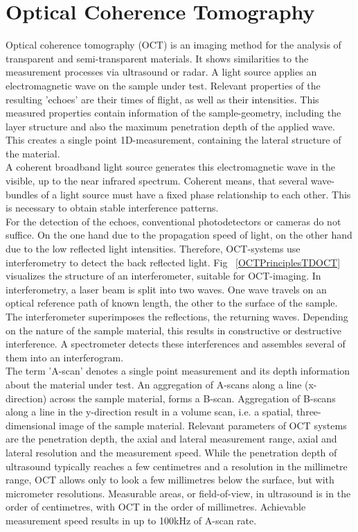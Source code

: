 \section{Optical Coherence Tomography}
Optical coherence tomography (OCT) is an imaging method for the analysis of transparent and semi-transparent materials. It shows similarities to the measurement processes via ultrasound or radar. A light source applies an electromagnetic wave on the sample under test. Relevant properties of the resulting 'echoes' are their times of flight, as well as their intensities. This measured properties contain information of the sample-geometry, including the layer structure and also the maximum penetration depth of the applied wave. This creates a single point 1D-measurement, containing the lateral structure of the material. \\ 
A coherent broadband light source generates this electromagnetic wave in the visible, up to the near infrared spectrum. Coherent means, that several wave-bundles of a light source must have a fixed phase relationship to each other. This is necessary to obtain stable interference patterns. \\ 
For the detection of the echoes, conventional photodetectors or cameras do not suffice. On the one hand due to the propagation speed of light, on the other hand due to the low reflected light intensities. Therefore, OCT-systems use interferometry to detect the back reflected light. Fig ~\ref{OCTPrinciplesTDOCT} visualizes the structure of an interferometer, suitable for OCT-imaging. In interferometry, a laser beam is split into two waves. One wave travels on an optical reference path of known length, the other to the surface of the sample. The interferometer superimposes the reflections, the returning waves. Depending on the nature of the sample material, this results in constructive or destructive interference. A spectrometer detects these interferences and assembles several of them into an interferogram.  \\ 
The term 'A-scan' denotes a single point measurement and its depth information about the material under test. An aggregation of A-scans along a line (x-direction) across the sample material, forms a B-scan. Aggregation of B-scans along a line in the y-direction result in a volume scan, i.e. a spatial, three-dimensional image of the sample material. Relevant parameters of OCT systems are the penetration depth, the axial and lateral measurement range, axial and lateral resolution and the measurement speed. While the penetration depth of ultrasound typically reaches a few centimetres and a resolution in the millimetre range, OCT allows only to look a few millimetres below the surface, but with micrometer resolutions. Measurable areas, or field-of-view, in ultrasound is in the order of centimetres, with OCT in the order of millimetres. Achievable measurement speed results in up to 100kHz of A-scan rate. \\ 
